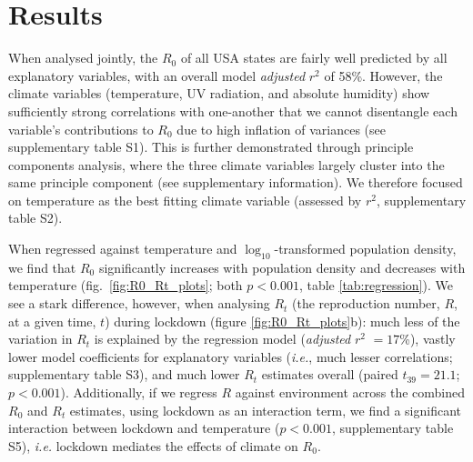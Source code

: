 \documentclass[12pt,english,a4paper]{article}
\newcommand{\RO}{$R_0$\xspace}
\begin{document}
\clearpage

\section*{Results}

When analysed jointly, the \RO of all USA states are fairly well predicted by all explanatory variables, with an overall model \textsl{adjusted} $r^2$ of 58\%. However, the climate variables (temperature, UV radiation, and absolute humidity) show sufficiently strong correlations with one-another that we cannot disentangle each variable's contributions to \RO due to high inflation of variances (see supplementary table S1). This is further demonstrated through principle components analysis, where the three climate variables largely cluster into the same principle component (see supplementary information). We therefore focused on temperature as the best fitting climate variable (assessed by $r^2$, supplementary table S2).

When regressed against temperature and $\log_{10}$-transformed population density, we find that \RO significantly increases with population density and decreases with temperature (fig.\ \ref{fig:R0_Rt_plots}; both $p < 0.001$, table \ref{tab:regression}).
We see a stark difference, however, when analysing $R_t$ (the reproduction number, $R$, at a given time, $t$) during lockdown (figure \ref{fig:R0_Rt_plots}b): much less of the variation in $R_t$ is explained by the regression model (\textsl{adjusted} $r^2$ $= 17$\%), vastly lower model coefficients for explanatory variables (\emph{i.e.}, much lesser correlations; supplementary table S3), and much lower $R_t$ estimates overall (paired $t_{39} = 21.1$; $p < 0.001$). Additionally, if we regress $R$ against environment across the combined \RO and $R_t$ estimates, using lockdown as an interaction term, we find a significant interaction between lockdown and temperature ($p < 0.001$, supplementary table S5), \emph{i.e.} lockdown mediates the effects of climate on \RO.
\end{document}
